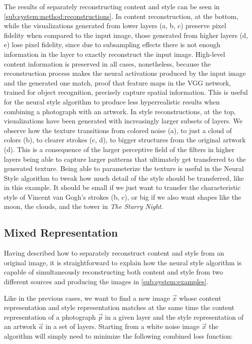 The results of separately reconstructing content and style can be seen in \autoref{sub:system:method:reconstructions}.
In content reconstruction, at the bottom, while the visualizations generated from lower layers (a, b, c) preserve pixel fidelity when compared to the input image, those generated from higher layers (d, e) lose pixel fidelity, since due to subsampling effects there is not enough information in the layer to exactly reconstruct the input image.
High-level content information is preserved in all cases, nonetheless, because the reconstruction process makes the neural activations produced by the input image and the generated one match, proof that feature maps in the VGG network, trained for object recognition, precisely capture spatial information.
This is useful for the neural style algorithm to produce less hyperrealistic results when combining a photograph with an artwork.
In style reconstructions, at the top, visualizations have been generated with increasingly larger subsets of layers.
We observe how the texture transitions from colored noise (a), to just a cloud of colors (b), to clearer strokes (c, d), to bigger structures from the original artwork (d).
This is a consequence of the larger perceptive field of the filters in higher layers being able to capture larger patterns that ultimately get transferred to the generated texture.
Being able to parameterize the texture is useful in the Neural Style algorithm to tweak how much detail of the style should be transferred, like in this example.
It should be small if we just want to transfer the characteristic style of Vincent van Gogh's strokes (b, c), or big if we also want shapes like the moon, the clouds, and the tower in \emph{The Starry Night}.


\subsection{Mixed Representation}
\label{sub:system:method:mixed-representation}

Having described how to separately reconstruct content and style from an original image, it is straightforward to explain how the neural style algorithm is capable of simultaneously reconstructing both content and style from two different sources and producing the images in \autoref{sub:system:examples}.

Like in the previous cases, we want to find a new image $\vec{x}$ whose content representation and style representation matches at the same time the content representation of a photograph $\vec{p}$ in a given layer and the style representation of an artwork $\vec{a}$ in a set of layers.
Starting from a white noise image $\vec{x}$ the algorithm will simply need to minimize the following combined loss function:

